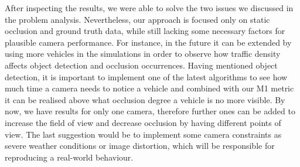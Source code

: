 After inspecting the results, we were able to solve the two issues we discussed in the problem analysis. Nevertheless, our approach is focused only on static occlusion and ground truth data, while still lacking some necessary factors for plausible camera performance. For instance, in the future it can be extended by using more vehicles in the simulations in order to observe how traffic density affects object detection and occlusion occurrences. Having mentioned object detection, it is important to implement one of the latest algorithms to see how much time a camera needs to notice a vehicle and combined with our M1 metric it can be realised above what occlusion degree a vehicle is no more visible. By now, we have results for only one camera, therefore further ones can be added to increase the field of view and decrease occlusion by having different points of view. The last suggestion would be to implement some camera constraints as severe weather conditions or image distortion, which will be responsible for reproducing a real-world behaviour.